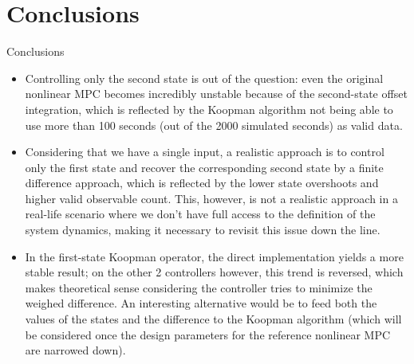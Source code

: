 \documentclass{beamer}
\begin{document}
\section{Conclusions}

\begin{frame}[allowframebreaks]{Conclusions}
    \begin{itemize}
        \item Controlling only the second state is out of the question: even the original nonlinear MPC becomes incredibly unstable because of the second-state offset integration, which is reflected by the Koopman algorithm not being able to use more than 100 seconds (out of the 2000 simulated seconds) as valid data.
        \item Considering that we have a single input, a realistic approach is to control only the first state and recover the corresponding second state by a finite difference approach, which is reflected by the lower state overshoots and higher valid observable count. This, however, is not a realistic approach in a real-life scenario where we don't have full access to the definition of the system dynamics, making it necessary to revisit this issue down the line.
        \item In the first-state Koopman operator, the direct implementation yields a more stable result; on the other 2 controllers however, this trend is reversed, which makes theoretical sense considering the controller tries to minimize the weighed difference. An interesting alternative would be to feed both the values of the states and the difference to the Koopman algorithm (which will be considered once the design parameters for the reference nonlinear MPC are narrowed down).
    \end{itemize}
\end{frame}
\end{document}

